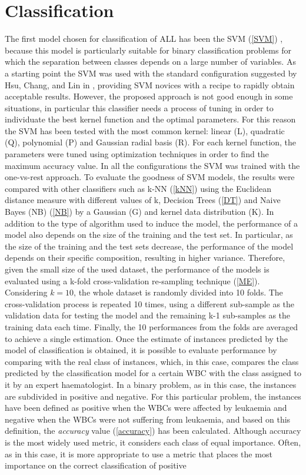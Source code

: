 \documentclass[final,a4paper,12pt,english]{UnicaPhdThesis3}
\begin{document}
	\section{Classification}
	The first model chosen for classification of ALL has been the SVM (\ref{SVM}) \cite{Put13b}, because this model is particularly suitable for binary classification problems for which the separation between classes depends on a large number of variables. As a starting point the SVM was used with the standard configuration suggested by Hsu, Chang, and Lin in \cite{Hsu}, providing SVM novices with a recipe to rapidly  obtain acceptable  results. However, the proposed approach is not good enough in some situations, in particular this classifier needs a process of tuning in order to individuate the best kernel function and the optimal parameters. For this reason  the SVM has been tested with  the  most  common  kernel:  linear  (L), quadratic  (Q), polynomial (P) and Gaussian radial basis (R). For each kernel function, the parameters were tuned using optimization techniques in order to find the maximum  accuracy value. In all the configurations the SVM was trained with the one-vs-rest approach. To  evaluate  the  goodness of SVM models, the results were compared with other classifiers such as k-NN (\ref{kNN}) using the Euclidean distance measure with different values  of k, Decision Trees (\ref{DT}) and Naive Bayes (\acs{NB}) (\ref{NB}) by  a Gaussian  (G)  and kernel data distribution (K). In addition to the type of algorithm  used to induce the model, the performance  of a model also depends on the  size of the  training  and the  test  set. In particular, as the size of the  training  and  the  test  sets decrease,  the  performance of the  model depends on their  specific composition, resulting in higher variance. Therefore, given the small size of the used dataset, the performance of the models is evaluated  using a k-fold cross-validation re-sampling technique (\ref{ME}).  Considering $k = 10$, the whole dataset is randomly divided into 10 folds. The cross-validation process is repeated 10 times, using a different sub-sample  as the validation data for testing the model and the remaining k-1 sub-samples as the training data each time. Finally,  the 10 performances  from the folds are averaged  to achieve a single estimation. Once the estimate  of instances  predicted  by the model of classification is obtained, it is possible to evaluate performance by comparing with the real class of instances,  which, in this case, compares the class predicted  by the classification model for a certain WBC with the class assigned to it by an expert haematologist.  In a binary problem, as in this case, the instances are subdivided in positive and negative. For this particular problem, the instances have been defined as positive when the WBCs were affected by leukaemia and negative when the WBCs were not suffering from leukaemia, and based on this definition, the \textit{accuracy} value (\ref{accuracy}) has been calculated. Although accuracy is the most widely used metric, it considers each class of equal importance. Often, as in this case, it is more appropriate to use a metric that places the most importance on the correct  classification of positive 
\end{document}
